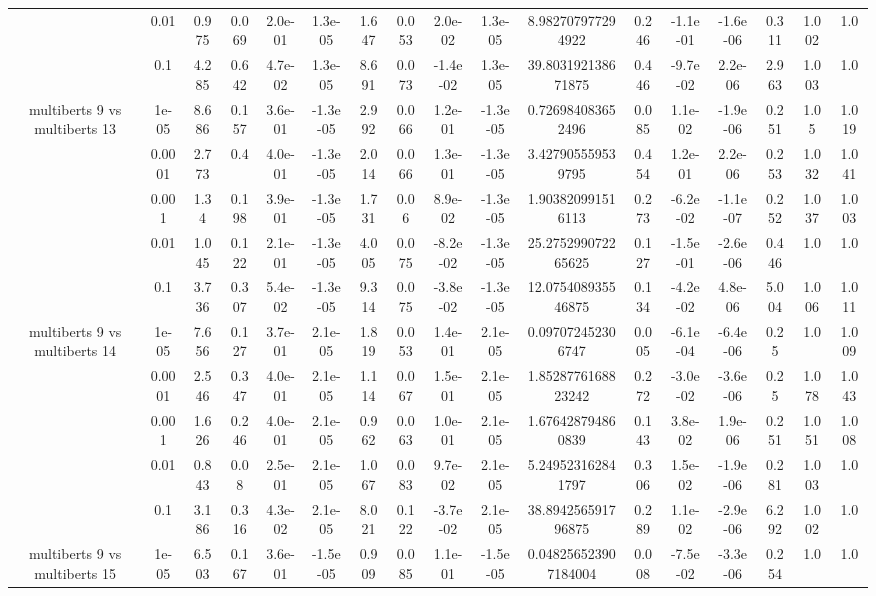 \begin{tabular}{|c|c|c|c|c|c|c|c|c|c|c|c|c|c|c|c|c|}
 & 0.01 & 0.975 & 0.069 & 2.0e-01 & 1.3e-05 & 1.647 & 0.053 & 2.0e-02 & 1.3e-05 & 8.982707977294922 & 0.246 & -1.1e-01 & -1.6e-06 & 0.311 & 1.002 & 1.0 \\
 & 0.1 & 4.285 & 0.642 & 4.7e-02 & 1.3e-05 & 8.691 & 0.073 & -1.4e-02 & 1.3e-05 & 39.803192138671875 & 0.446 & -9.7e-02 & 2.2e-06 & 2.963 & 1.003 & 1.0 \\
\hline
\multirow{5}{*}{multiberts 9 vs multiberts 13} & 1e-05 & 8.686 & 0.157 & 3.6e-01 & -1.3e-05 & 2.992 & 0.066 & 1.2e-01 & -1.3e-05 & 0.726984083652496 & 0.085 & 1.1e-02 & -1.9e-06 & 0.251 & 1.05 & 1.019 \\
 & 0.0001 & 2.773 & 0.4 & 4.0e-01 & -1.3e-05 & 2.014 & 0.066 & 1.3e-01 & -1.3e-05 & 3.427905559539795 & 0.454 & 1.2e-01 & 2.2e-06 & 0.253 & 1.032 & 1.041 \\
 & 0.001 & 1.34 & 0.198 & 3.9e-01 & -1.3e-05 & 1.731 & 0.06 & 8.9e-02 & -1.3e-05 & 1.903820991516113 & 0.273 & -6.2e-02 & -1.1e-07 & 0.252 & 1.037 & 1.003 \\
 & 0.01 & 1.045 & 0.122 & 2.1e-01 & -1.3e-05 & 4.005 & 0.075 & -8.2e-02 & -1.3e-05 & 25.275299072265625 & 0.127 & -1.5e-01 & -2.6e-06 & 0.446 & 1.0 & 1.0 \\
 & 0.1 & 3.736 & 0.307 & 5.4e-02 & -1.3e-05 & 9.314 & 0.075 & -3.8e-02 & -1.3e-05 & 12.075408935546875 & 0.134 & -4.2e-02 & 4.8e-06 & 5.004 & 1.006 & 1.011 \\
\hline
\multirow{5}{*}{multiberts 9 vs multiberts 14} & 1e-05 & 7.656 & 0.127 & 3.7e-01 & 2.1e-05 & 1.819 & 0.053 & 1.4e-01 & 2.1e-05 & 0.097072452306747 & 0.005 & -6.1e-04 & -6.4e-06 & 0.25 & 1.0 & 1.009 \\
 & 0.0001 & 2.546 & 0.347 & 4.0e-01 & 2.1e-05 & 1.114 & 0.067 & 1.5e-01 & 2.1e-05 & 1.8528776168823242 & 0.272 & -3.0e-02 & -3.6e-06 & 0.25 & 1.078 & 1.043 \\
 & 0.001 & 1.626 & 0.246 & 4.0e-01 & 2.1e-05 & 0.962 & 0.063 & 1.0e-01 & 2.1e-05 & 1.676428794860839 & 0.143 & 3.8e-02 & 1.9e-06 & 0.251 & 1.051 & 1.008 \\
 & 0.01 & 0.843 & 0.08 & 2.5e-01 & 2.1e-05 & 1.067 & 0.083 & 9.7e-02 & 2.1e-05 & 5.249523162841797 & 0.306 & 1.5e-02 & -1.9e-06 & 0.281 & 1.003 & 1.0 \\
 & 0.1 & 3.186 & 0.316 & 4.3e-02 & 2.1e-05 & 8.021 & 0.122 & -3.7e-02 & 2.1e-05 & 38.894256591796875 & 0.289 & 1.1e-02 & -2.9e-06 & 6.292 & 1.002 & 1.0 \\
\hline
\multirow{5}{*}{multiberts 9 vs multiberts 15} & 1e-05 & 6.503 & 0.167 & 3.6e-01 & -1.5e-05 & 0.909 & 0.085 & 1.1e-01 & -1.5e-05 & 0.048256523907184004 & 0.008 & -7.5e-02 & -3.3e-06 & 0.254 & 1.0 & 1.0 \\

\end{tabular}

